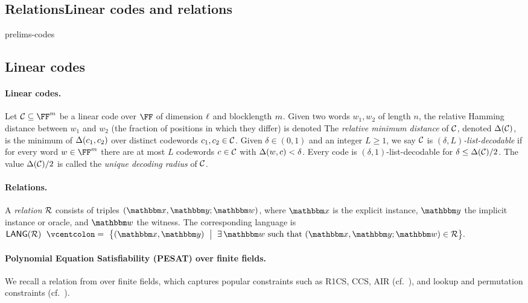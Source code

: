 \subsection{\iflncs Relations\else Linear codes and relations\fi}\label{s:prelims_codes}

\begin{lncsappendix}{prelims-codes}
\iflncs\subsection{Linear codes}\label{a:prelims_codes}\else\paragraph{Linear codes.}\fi

Let $\cC \subseteq \FF^{\codelength}$ be a linear code over $\FF$ of dimension $\ell$ and blocklength $m$.  Given two words $w_1, w_2$ of length $n$, the relative Hamming distance between $w_1$ and $w_2$ (the fraction of positions in which they differ) is denoted 
%
The \emph{relative minimum distance} of $\mathcal{C}$, denoted $\Delta(\mathcal{C})$, is the minimum of $\Delta(c_1,c_2)$ over distinct codewords $c_1,c_2\in \mathcal{C}$. 
Given $\delta\in (0,1)$ and an integer $L\geq 1$, we say $\mathcal{C}$ is \emph{$(\delta, L)$-list-decodable} if for every word $w\in \FF^{\codelength}$ there are at most $L$ codewords $c\in \mathcal{C}$ with $\Delta(w,c)<\delta$. Every code is $(\delta,1)$-list-decodable for $\delta\leq \Delta(\mathcal{C})/2$.  The value $\Delta(\mathcal{C})/2$ is called the \emph{unique decoding radius} of $\mathcal{C}$.
\end{lncsappendix}

\paragraph{Relations.}
A \emph{relation} $\mathcal{R}$ consists of triples  $(\inp,\oracle;\wit)$, where $\inp$ is the explicit instance, $\oracle$ the implicit instance or oracle, and $\wit$ the witness.  The corresponding language  is 
\(
  \LANG(\Relation)\ \defeq\ \bigl\{(\inp,\oracle)\ \bigm|\ \exists\,\wit \text{ such that } (\inp,\oracle;\wit)\in\Relation\bigr\}.
\)

\paragraph{Polynomial Equation Satisfiability (PESAT) over finite fields.} We recall a relation from \cite{BCFW25}  over finite fields, which captures popular constraints such as R1CS, CCS, AIR (cf.\ \cite{BCFW25}), and lookup and permutation constraints (cf.\ \cite{zinc}).

